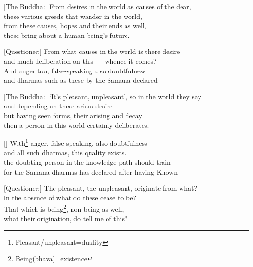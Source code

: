 \begin{MyDescription}{}[The Buddha:]
From desires in the world as causes of the dear,\\
these various greeds that wander in the world,\\
from these causes, hopes and their ends as well,\\
these bring about a human being's future.
\end{MyDescription}

\begin{MyDescription}{}[Questioner:]
From what causes in the world is there desire\\
and much deliberation on this — whence it comes?\\
And anger too, false-speaking also doubtfulness\\
and dharmas such as these by the Samana declared
\end{MyDescription}

\begin{MyDescription}{}[The Buddha:]
`It's pleasant, unpleasant', so in the world they say\\
and depending on these arises desire\\
but having seen forms, their arising and decay\\
then a person in this world certainly deliberates.
\end{MyDescription}

\begin{MyDescription}{}[]
With\footnote{Pleasant/unpleasant=duality} anger, false-speaking, also doubtfulness\\
and all such dharmas, this quality exists.\\
the doubting person in the knowledge-path should train\\
for the Samana dharmas has declared after having Known
\end{MyDescription}

\begin{MyDescription}{}[Questioner:]
The pleasant, the unpleasant, originate from what?\\
ln the absence of what do these cease to be?\\
That which is being\footnote{Being(bhava)=existence}, non-being as well,\\
what their origination, do tell me of this?
\end{MyDescription}

